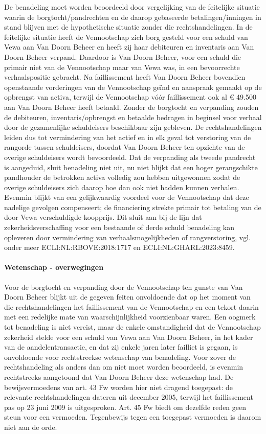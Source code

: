 \documentclass[
  dutch,
  a4paper,
]{article}
\begin{document}
De benadeling moet worden beoordeeld door vergelijking van de feitelijke situatie waarin de borgtocht/pandrechten en de daarop gebaseerde betalingen/inningen in stand blijven met de hypothetische situatie zonder die rechtshandelingen. In de feitelijke situatie heeft de Vennootschap zich borg gesteld voor een schuld van Vewa aan Van Doorn Beheer en heeft zij haar debiteuren en inventaris aan Van Doorn Beheer verpand. Daardoor is Van Doorn Beheer, voor een schuld die primair niet van de Vennootschap maar van Vewa was, in een bevoorrechte verhaalspositie gebracht. Na faillissement heeft Van Doorn Beheer bovendien openstaande vorderingen van de Vennootschap geïnd en aanspraak gemaakt op de opbrengst van activa, terwijl de Vennootschap vóór faillissement ook al € 49.500 aan Van Doorn Beheer heeft betaald. Zonder de borgtocht en verpanding zouden de debiteuren, inventaris/opbrengst en betaalde bedragen in beginsel voor verhaal door de gezamenlijke schuldeisers beschikbaar zijn gebleven. De rechtshandelingen leiden dus tot vermindering van het actief en in elk geval tot verstoring van de rangorde tussen schuldeisers, doordat Van Doorn Beheer ten opzichte van de overige schuldeisers wordt bevoordeeld. Dat de verpanding als tweede pandrecht is aangeduid, sluit benadeling niet uit, nu niet blijkt dat een hoger gerangschikte pandhouder de betrokken activa volledig zou hebben uitgewonnen zodat de overige schuldeisers zich daarop hoe dan ook niet hadden kunnen verhalen. Evenmin blijkt van een gelijkwaardig voordeel voor de Vennootschap dat deze nadelige gevolgen compenseert; de financiering strekte primair tot betaling van de door Vewa verschuldigde koopprijs. Dit sluit aan bij de lijn dat zekerheidsverschaffing voor een bestaande of derde schuld benadeling kan opleveren door vermindering van verhaalsmogelijkheden of rangverstoring, vgl. onder meer ECLI:NL:RBOVE:2018:1717 en ECLI:NL:GHARL:2023:8459.

\paragraph{Wetenschap - overwegingen}\label{wetenschap---overwegingen-7}

Voor de borgtocht en verpanding door de Vennootschap ten gunste van Van Doorn Beheer blijkt uit de gegeven feiten onvoldoende dat op het moment van die rechtshandelingen het faillissement van de Vennootschap en een tekort daarin met een redelijke mate van waarschijnlijkheid voorzienbaar waren. Een oogmerk tot benadeling is niet vereist, maar de enkele omstandigheid dat de Vennootschap zekerheid stelde voor een schuld van Vewa aan Van Doorn Beheer, in het kader van de aandelentransactie, en dat zij enkele jaren later failliet is gegaan, is onvoldoende voor rechtstreekse wetenschap van benadeling. Voor zover de rechtshandeling als anders dan om niet moet worden beoordeeld, is evenmin rechtstreeks aangetoond dat Van Doorn Beheer deze wetenschap had. De bewijsvermoedens van art. 43 Fw worden hier niet dragend toegepast: de relevante rechtshandelingen dateren uit december 2005, terwijl het faillissement pas op 23 juni 2009 is uitgesproken. Art. 45 Fw biedt om dezelfde reden geen steun voor een vermoeden. Tegenbewijs tegen een toegepast vermoeden is daarom niet aan de orde.
\end{document}
